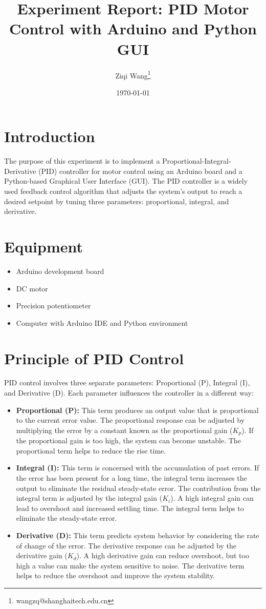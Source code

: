 \documentclass{article}
\title{Experiment Report: PID Motor Control with Arduino and Python GUI}
\author{Ziqi Wang\thanks{wangzq@shanghaitech.edu.cn}}
\date{\today}
\begin{document}
\maketitle

\section{Introduction}
The purpose of this experiment is to implement a Proportional-Integral-Derivative (PID) controller for motor control using an Arduino board and a Python-based Graphical User Interface (GUI). The PID controller is a widely used feedback control algorithm that adjusts the system's output to reach a desired setpoint by tuning three parameters: proportional, integral, and derivative.

\section{Equipment}
\begin{itemize}
    \item Arduino development board
    \item DC motor
    \item Precision potentiometer
    \item Computer with Arduino IDE and Python environment
\end{itemize}

\section{Principle of PID Control}
PID control involves three separate parameters: Proportional (P), Integral (I), and Derivative (D). Each parameter influences the controller in a different way:

\begin{itemize}
    \item \textbf{Proportional (P):} This term produces an output value that is proportional to the current error value. The proportional response can be adjusted by multiplying the error by a constant known as the proportional gain ($K_p$). If the proportional gain is too high, the system can become unstable. The proportional term helps to reduce the rise time.
    \item \textbf{Integral (I):} This term is concerned with the accumulation of past errors. If the error has been present for a long time, the integral term increases the output to eliminate the residual steady-state error. The contribution from the integral term is adjusted by the integral gain ($K_i$). A high integral gain can lead to overshoot and increased settling time. The integral term helps to eliminate the steady-state error.
    \item \textbf{Derivative (D):} This term predicts system behavior by considering the rate of change of the error. The derivative response can be adjusted by the derivative gain ($K_d$). A high derivative gain can reduce overshoot, but too high a value can make the system sensitive to noise. The derivative term helps to reduce the overshoot and improve the system stability.
\end{itemize}
\end{document}

